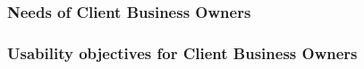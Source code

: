 \documentclass[]{VUMIFTemplateClass}
\begin{document}
\subsubsection{Needs of Client Business Owners}

\subsubsection{Usability objectives for Client Business Owners}








\end{document}
